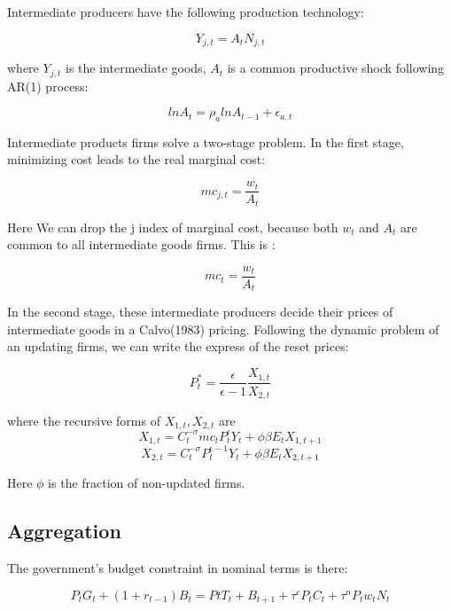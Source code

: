 \documentclass[10pt,math=newtx,citestyle=gb7714-2015,bibstyle=gb7714-2015]{elegantbook}
\begin{document}
{	Intermediate producers have the following production technology:
	
	\begin{equation}
		Y_{j,t}=A_tN_{j,t}
	\end{equation}
	
	where $Y_{j,t}$ is the intermediate goods, $A_t$ is a common productive shock following AR(1) process:
	
	\begin{equation}
		lnA_t=\rho_a lnA_{t-1}+\epsilon_{a,t}
	\end{equation}
	
	Intermediate products firms solve a two-stage problem. In the first stage, minimizing cost leads to the real marginal cost:
	
	$$mc_{j,t}=\frac{w_t}{A_t}$$
	
	Here We can drop the j index of marginal cost, because both $w_t$ and $A_t$ are common to all intermediate goods firms. This is :
	
	\begin{equation}
		mc_{t}=\frac{w_t}{A_t}
	\end{equation}
	
	In the second stage, these intermediate producers decide their prices of intermediate goods in a Calvo(1983) pricing. Following the dynamic problem of an updating firms, we can write the express of the reset prices:
	
	\begin{equation}
		P_t^{*}=\frac{\epsilon}{\epsilon-1}\frac{X_{1,t}}{X_{2,t}}
	\end{equation}
	
	where the recursive forms of $X_{1,t}, X_{2,t}$ are
	\begin{equation}
		X_{1,t}=C_t^{-\sigma}mc_tP_t^{\epsilon}Y_t+\phi \beta E_tX_{1,t+1}
	\end{equation}
	\begin{equation}
		X_{2,t}=C_t^{-\sigma}P_t^{\epsilon-1}Y_t+\phi \beta E_tX_{2,t+1}
	\end{equation}
	
	Here $\phi$ is the fraction of non-updated firms.
	
	\subsection{Aggregation}
	
	The government's budget constraint in nominal terms is there:
	
	$$P_tG_t+(1+r_{t-1})B_t=PtT_t+B_{t+1}+\tau^cP_tC_t+\tau^nP_tw_tN_t$$
	
}
\end{document}
